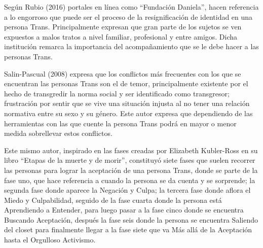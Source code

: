 Según Rubio (2016) portales en línea como “Fundación Daniela”, hacen referencia
a lo engorroso que puede ser el proceso de la resignificación de identidad en
una persona Trans.
Principalmente expresan que gran parte de los sujetos se ven expuestos a malos
tratos a nivel familiar, profesional y entre amigos.
Dicha institución remarca la importancia del acompañamiento que se le debe hacer
a las personas Trans.

Salin-Pascual (2008) expresa que los conflictos más frecuentes con los que se
encuentran las personas Trans son el de temor, principalmente existente por el
hecho de transgredir la norma social y ser identificado como transgresor;
frustración por sentir que se vive una situación injusta al no tener una
relación normativa entre su sexo y su género.
Este autor expresa que dependiendo de las herramientas con las que cuente la
persona Trans podrá en mayor o menor medida sobrellevar estos conflictos.

Este mismo autor, inspirado en las fases creadas por Elizabeth Kubler-Ross en su
libro “Etapas de la muerte y de morir”, constituyó siete fases que suelen
recorrer las personas para lograr la aceptación de una persona Trans, donde se
parte de la fase uno, que hace referencia a cuando la persona se da cuenta y se
sorprende;
la segunda fase donde aparece la Negación y Culpa;
la tercera fase donde aflora el Miedo y Culpabilidad, seguido de la fase
cuarta donde la persona está Aprendiendo a Entender, para luego pasar a la
fase cinco donde se encuentra Buscando Aceptación, después la fase seis donde la
persona se encuentra Saliendo del closet para finalmente llegar a la fase
siete que va Más allá de la Aceptación hasta el Orgulloso Activismo.
